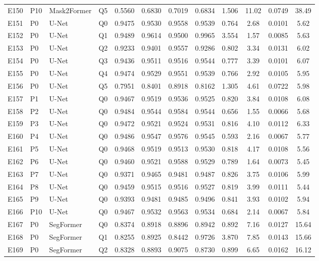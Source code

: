 \begin{longtable}{@{}lllllccccccc@{}}
E150 & P10 & Mask2Former & Q5 & 0.5560 & 0.6830 & 0.7019 & 0.6834 & 1.506 & 11.02 & 0.0749 & 38.49 \\
E151 & P0 & U-Net & Q0 & 0.9475 & 0.9530 & 0.9558 & 0.9539 & 0.764 & 2.68 & 0.0101 & 5.62 \\
E152 & P0 & U-Net & Q1 & 0.9489 & 0.9614 & 0.9500 & 0.9965 & 3.554 & 1.57 & 0.0085 & 5.63 \\
E153 & P0 & U-Net & Q2 & 0.9233 & 0.9401 & 0.9557 & 0.9286 & 0.802 & 3.34 & 0.0131 & 6.02 \\
E154 & P0 & U-Net & Q3 & 0.9436 & 0.9511 & 0.9516 & 0.9544 & 0.777 & 3.39 & 0.0101 & 6.07 \\
E155 & P0 & U-Net & Q4 & 0.9474 & 0.9529 & 0.9551 & 0.9539 & 0.766 & 2.92 & 0.0105 & 5.95 \\
E156 & P0 & U-Net & Q5 & 0.7951 & 0.8401 & 0.8918 & 0.8162 & 1.305 & 4.61 & 0.0722 & 5.98 \\
E157 & P1 & U-Net & Q0 & 0.9467 & 0.9519 & 0.9536 & 0.9525 & 0.820 & 3.84 & 0.0108 & 6.08 \\
E158 & P2 & U-Net & Q0 & 0.9484 & 0.9544 & 0.9584 & 0.9544 & 0.656 & 1.55 & 0.0066 & 5.68 \\
E159 & P3 & U-Net & Q0 & 0.9472 & 0.9521 & 0.9524 & 0.9531 & 0.816 & 4.10 & 0.0112 & 6.33 \\
E160 & P4 & U-Net & Q0 & 0.9486 & 0.9547 & 0.9576 & 0.9545 & 0.593 & 2.16 & 0.0067 & 5.77 \\
E161 & P5 & U-Net & Q0 & 0.9468 & 0.9519 & 0.9513 & 0.9530 & 0.818 & 4.17 & 0.0108 & 5.56 \\
E162 & P6 & U-Net & Q0 & 0.9460 & 0.9521 & 0.9588 & 0.9529 & 0.789 & 1.64 & 0.0073 & 5.45 \\
E163 & P7 & U-Net & Q0 & 0.9371 & 0.9465 & 0.9481 & 0.9487 & 0.826 & 3.75 & 0.0106 & 5.99 \\
E164 & P8 & U-Net & Q0 & 0.9459 & 0.9515 & 0.9516 & 0.9527 & 0.819 & 3.99 & 0.0111 & 5.44 \\
E165 & P9 & U-Net & Q0 & 0.9393 & 0.9481 & 0.9485 & 0.9496 & 0.841 & 3.93 & 0.0102 & 5.94 \\
E166 & P10 & U-Net & Q0 & 0.9467 & 0.9532 & 0.9563 & 0.9534 & 0.684 & 2.14 & 0.0067 & 5.84 \\
E167 & P0 & SegFormer & Q0 & 0.8374 & 0.8918 & 0.8896 & 0.8942 & 0.892 & 7.16 & 0.0127 & 15.64 \\
E168 & P0 & SegFormer & Q1 & 0.8255 & 0.8925 & 0.8442 & 0.9726 & 3.870 & 7.85 & 0.0143 & 15.66 \\
E169 & P0 & SegFormer & Q2 & 0.8328 & 0.8893 & 0.9075 & 0.8730 & 0.899 & 6.65 & 0.0162 & 16.12 \\

\end{longtable}
